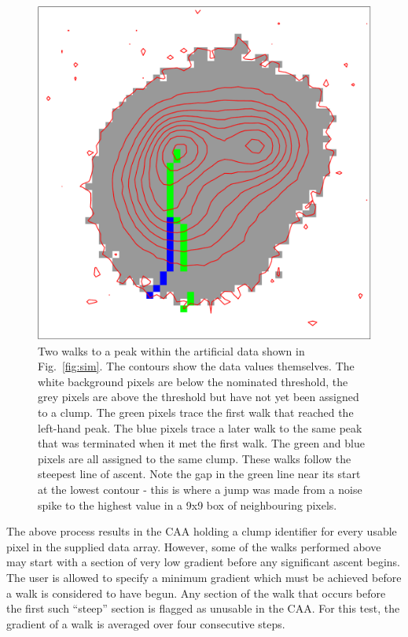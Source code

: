 \documentclass[final,authoryear,5p,times,twocolumn]{elsarticle}
\begin{document}
\begin{figure}
\includegraphics[width=\columnwidth]{walks}
\caption{Two walks to a peak within the artificial data shown in
Fig.~\ref{fig:sim}. The contours show the data values themselves. The white
background pixels are below the nominated threshold, the grey pixels are
above the threshold but have not yet been assigned to a clump. The green
pixels trace the first walk that reached the left-hand peak. The blue pixels
trace a later walk to the same peak that was terminated when it met the first
walk. The green and blue pixels are all assigned to the same clump. These
walks follow the steepest line of ascent. Note the gap in the green line
near its start at the lowest contour - this is where a jump was made from
a noise spike to the highest value in a 9x9 box of neighbouring pixels.}

\label{fig:walks}
\end{figure}

The above process results in the CAA holding a clump identifier for every
usable pixel in the supplied data array. However, some of the walks
performed above may start with a section of very low gradient before any
significant ascent begins. The user is allowed to specify a minimum
gradient which must be achieved before a walk is considered to have
begun. Any section of the walk that occurs before the first such
``steep'' section is flagged as unusable in the CAA. For this test,
the gradient of a walk is averaged over four consecutive steps.
\end{document}
